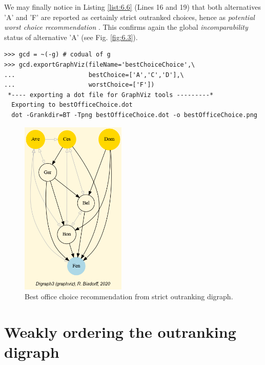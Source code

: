 We may finally notice in Listing \ref{list:6.6} (Lines 16 and 19) that both alternatives 'A' and 'F' are reported as certainly strict outranked choices, hence as \emph{potential worst choice recommendation} . This confirms again the global \emph{incomparability} status of alternative 'A' (see Fig. \ref{fig:6.3}).
\begin{lstlisting}
>>> gcd = ~(-g) # codual of g
>>> gcd.exportGraphViz(fileName='bestChoiceChoice',\
...                    bestChoice=['A','C','D'],\
...                    worstChoice=['F'])
 *---- exporting a dot file for GraphViz tools ---------*
  Exporting to bestOfficeChoice.dot
  dot -Grankdir=BT -Tpng bestOfficeChoice.dot -o bestOfficeChoice.png
\end{lstlisting}
\begin{figure}[h]
\sidecaption[t]
\includegraphics[width=5cm]{Figures/bestOfficeChoice.png}
\caption{Best office choice recommendation from strict outranking digraph.}
\label{fig:6.4}       %
\end{figure}

\section{Weakly ordering the outranking digraph}
\label{sec:6.6}

